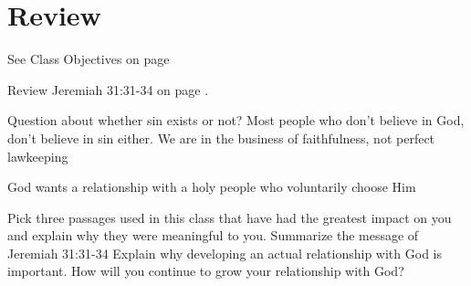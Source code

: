 \chapter{Review}

\begin{goals}
\goal See Class Objectives on page \pageref{sec:ClassObjectives}
\end{goals}
\begin{bible}
Review Jeremiah 31:31-34 on page \pageref{sec:KeyPassage}.
\end{bible}

\begin{discussion}
Question about whether sin exists or not? Most people who don't believe in God, don't believe in sin either.
We are in the business of faithfulness, not perfect lawkeeping

God wants a relationship with a holy people who voluntarily choose Him




\end{discussion}

\begin{questions}
\q Pick three passages used in this class that have had the greatest impact on you and explain why they were meaningful to you.
\q Summarize the message of Jeremiah 31:31-34
\q Explain why developing an actual relationship with God is important.
\q How will you continue to grow your relationship with God?
\end{questions}